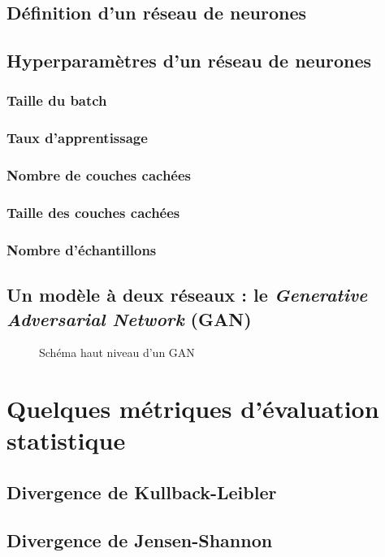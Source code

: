         \subsection{Définition d'un réseau de neurones}
        \subsection{Hyperparamètres d'un réseau de neurones}
            \subsubsection{Taille du batch}
            \subsubsection{Taux d'apprentissage}
            \subsubsection{Nombre de couches cachées}
            \subsubsection{Taille des couches cachées}
            \subsubsection{Nombre d'échantillons}
        \subsection{Un modèle à deux réseaux : le \textit{Generative Adversarial Network} (GAN)}
            \begin{figure}[H]
                \centering
                \fbox{}
                \caption{Schéma haut niveau d'un GAN}
            \end{figure}
    \section{Quelques métriques d'évaluation statistique}
        \subsection{Divergence de Kullback-Leibler}
        \subsection{Divergence de Jensen-Shannon}
